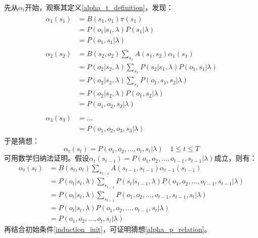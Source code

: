 \documentclass[11pt,a4paper]{article}
\numberwithin{equation}{section}
\begin{document}
先从$\alpha_t$开始，观察其定义\eqref{alpha_t_definition}，发现：
\begin{align}
\begin{split}\label{induction_init}
\alpha_1(s_1) & = B(s_1, o_1) \pi(s_1) \\
& = P(o_1 | s_1, \lambda) P(s_1 | \lambda) \\ 
& = P(o_1, s_1 | \lambda)
\end{split}
\\
\begin{split}
\alpha_2(s_2) & = B(s_2, o_2) \sum_{s_1} A(s_1, s_2) \alpha_1(s_1) \\
& = P(o_2 | s_2, \lambda) \sum_{s_1} P(s_2 | s_1, \lambda) P(o_1, s_1 | \lambda) \\
& = P(o_2 | s_2, \lambda) \sum_{s_1} P(o_1, s_1, s_2 | \lambda) \\
& = P(o_2 | s_2, \lambda) P(o_1, s_2 | \lambda) \\
& = P(o_1, o_2, s_2 | \lambda)
\end{split}
\\
\begin{split}
\alpha_3(s_3) & = \ldots \\
& = P(o_1, o_2, o_3, s_3 | \lambda)
\end{split}
\end{align}
于是猜想：
\begin{equation}\label{alpha_p_relation}
\alpha_t(s_t) = P(o_1, o_2, \ldots, o_t, s_t | \lambda) \quad 1 \le t \le T
\end{equation}
可用数学归纳法证明。假设$\alpha_t(s_{t - 1}) = P(o_1, o_2, \ldots, o_{t - 1}, s_{t - 1} | \lambda)$成立，则有：
\begin{equation*}
\begin{split}
\alpha_t(s_t) & = B(s_t, o_t) \sum_{s_{t - 1}} A(s_{t - 1}, s_{t - 1}) \alpha_{t - 1}(s_{t - 1}) \\
& = P(o_t | s_t, \lambda) \sum_{s_{t - 1}} P(s_t | s_{t - 1}, \lambda) P(o_1, o_2, \ldots, o_{t - 1}, s_{t - 1} | \lambda) \\
& = P(o_t | s_t, \lambda) \sum_{s_{t - 1}} P(o_1, o_2, \ldots, o_{t - 1}, s_{t - 1}, s_t | \lambda) \\
& = P(o_t | s_t, \lambda) P(o_1, o_2, \ldots, o_{t - 1}, s_t | \lambda) \\
& = P(o_1, o_2, \ldots, o_t, s_t | \lambda)
\end{split}
\end{equation*}
再结合初始条件\eqref{induction_init}，可证明猜想\eqref{alpha_p_relation}。
\end{document}
